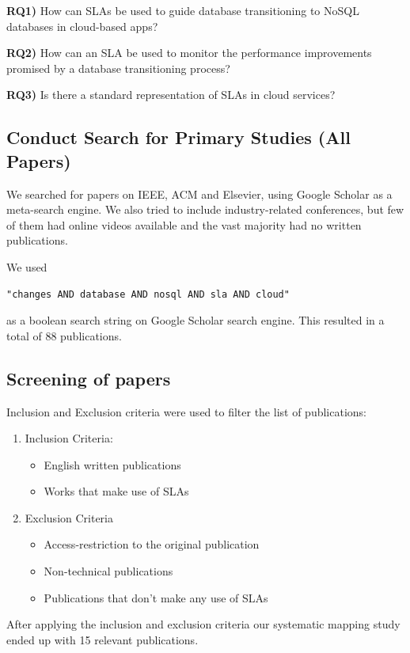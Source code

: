 \documentclass{article}
\begin{document}
\textbf{RQ1)}  How can SLAs be used to guide database transitioning to NoSQL databases in cloud-based apps? 

\textbf{RQ2)} How can an SLA be used to monitor the performance improvements promised by a database transitioning process?

\textbf{RQ3)} Is there a standard representation of SLAs in cloud services? 

\subsection{Conduct Search for Primary Studies (All Papers)}

We searched for papers on IEEE, ACM and Elsevier, using Google Scholar as a meta-search engine. We also tried to include industry-related conferences, but few of them had online videos available and the vast majority had no written publications.

We used \begin{verbatim}"changes AND database AND nosql AND sla AND cloud"\end{verbatim} as a boolean search string on Google Scholar search engine. This resulted in a total of 88 publications.


\subsection{Screening of papers}
Inclusion and Exclusion criteria were used to filter the list of publications:
\begin{enumerate}
    \item Inclusion Criteria: 
    \begin{itemize}
  		\item English written publications
  		\item Works that make use of SLAs 
    \end{itemize}
    \item Exclusion Criteria
	\begin{itemize}
		\item Access-restriction to the original publication
		\item Non-technical publications 
		\item Publications that don't make any use of SLAs	
    \end{itemize}
    
\end{enumerate}

After applying the inclusion and exclusion criteria our systematic mapping study ended up with 15 relevant publications.
\end{document}
